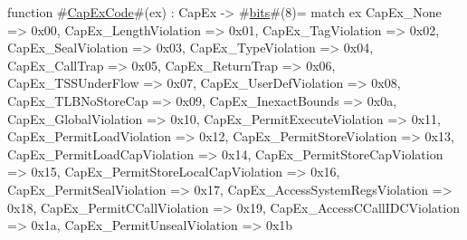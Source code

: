 function #\hyperref[zCapExCode]{CapExCode}#(ex) : CapEx -> #\hyperref[zbits]{bits}#(8)=
  match ex {
    CapEx_None                          => 0x00,
    CapEx_LengthViolation               => 0x01,
    CapEx_TagViolation                  => 0x02,
    CapEx_SealViolation                 => 0x03,
    CapEx_TypeViolation                 => 0x04,
    CapEx_CallTrap                      => 0x05,
    CapEx_ReturnTrap                    => 0x06,
    CapEx_TSSUnderFlow                  => 0x07,
    CapEx_UserDefViolation              => 0x08,
    CapEx_TLBNoStoreCap                 => 0x09,
    CapEx_InexactBounds                 => 0x0a,
    CapEx_GlobalViolation               => 0x10,
    CapEx_PermitExecuteViolation        => 0x11,
    CapEx_PermitLoadViolation           => 0x12,
    CapEx_PermitStoreViolation          => 0x13,
    CapEx_PermitLoadCapViolation        => 0x14,
    CapEx_PermitStoreCapViolation       => 0x15,
    CapEx_PermitStoreLocalCapViolation  => 0x16,
    CapEx_PermitSealViolation           => 0x17,
    CapEx_AccessSystemRegsViolation     => 0x18,
    CapEx_PermitCCallViolation          => 0x19,
    CapEx_AccessCCallIDCViolation       => 0x1a,
    CapEx_PermitUnsealViolation         => 0x1b
  }
